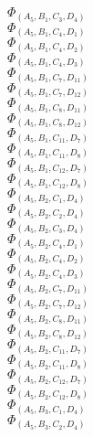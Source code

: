 \documentclass[14pt]{article}
\begin{document}
    $\Phi_{({A}_{5}, {B}_{1}, {C}_{3}, {D}_{4})}$ \\ 
    $\Phi_{({A}_{5}, {B}_{1}, {C}_{4}, {D}_{1})}$ \\ 
    $\Phi_{({A}_{5}, {B}_{1}, {C}_{4}, {D}_{2})}$ \\ 
    $\Phi_{({A}_{5}, {B}_{1}, {C}_{4}, {D}_{3})}$ \\ 
    $\Phi_{({A}_{5}, {B}_{1}, {C}_{7}, {D}_{11})}$ \\ 
    $\Phi_{({A}_{5}, {B}_{1}, {C}_{7}, {D}_{12})}$ \\ 
    $\Phi_{({A}_{5}, {B}_{1}, {C}_{8}, {D}_{11})}$ \\ 
    $\Phi_{({A}_{5}, {B}_{1}, {C}_{8}, {D}_{12})}$ \\ 
    $\Phi_{({A}_{5}, {B}_{1}, {C}_{11}, {D}_{7})}$ \\ 
    $\Phi_{({A}_{5}, {B}_{1}, {C}_{11}, {D}_{8})}$ \\ 
    $\Phi_{({A}_{5}, {B}_{1}, {C}_{12}, {D}_{7})}$ \\ 
    $\Phi_{({A}_{5}, {B}_{1}, {C}_{12}, {D}_{8})}$ \\ 
    $\Phi_{({A}_{5}, {B}_{2}, {C}_{1}, {D}_{4})}$ \\ 
    $\Phi_{({A}_{5}, {B}_{2}, {C}_{2}, {D}_{4})}$ \\ 
    $\Phi_{({A}_{5}, {B}_{2}, {C}_{3}, {D}_{4})}$ \\ 
    $\Phi_{({A}_{5}, {B}_{2}, {C}_{4}, {D}_{1})}$ \\ 
    $\Phi_{({A}_{5}, {B}_{2}, {C}_{4}, {D}_{2})}$ \\ 
    $\Phi_{({A}_{5}, {B}_{2}, {C}_{4}, {D}_{3})}$ \\ 
    $\Phi_{({A}_{5}, {B}_{2}, {C}_{7}, {D}_{11})}$ \\ 
    $\Phi_{({A}_{5}, {B}_{2}, {C}_{7}, {D}_{12})}$ \\ 
    $\Phi_{({A}_{5}, {B}_{2}, {C}_{8}, {D}_{11})}$ \\ 
    $\Phi_{({A}_{5}, {B}_{2}, {C}_{8}, {D}_{12})}$ \\ 
    $\Phi_{({A}_{5}, {B}_{2}, {C}_{11}, {D}_{7})}$ \\ 
    $\Phi_{({A}_{5}, {B}_{2}, {C}_{11}, {D}_{8})}$ \\ 
    $\Phi_{({A}_{5}, {B}_{2}, {C}_{12}, {D}_{7})}$ \\ 
    $\Phi_{({A}_{5}, {B}_{2}, {C}_{12}, {D}_{8})}$ \\ 
    $\Phi_{({A}_{5}, {B}_{3}, {C}_{1}, {D}_{4})}$ \\ 
    $\Phi_{({A}_{5}, {B}_{3}, {C}_{2}, {D}_{4})}$ \\ 
\end{document}
